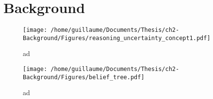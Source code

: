 \chapter{Background}



\begin{figure}[h]
 \centering
 \texttt{[image: /home/guillaume/Documents/Thesis/ch2-Background/Figures/reasoning\_uncertainty\_concept1.pdf]}
 \caption{ad}
\end{figure}

\begin{figure}[h]
 \centering
 \texttt{[image: /home/guillaume/Documents/Thesis/ch2-Background/Figures/belief\_tree.pdf]}
  \caption{ad}
\end{figure}

